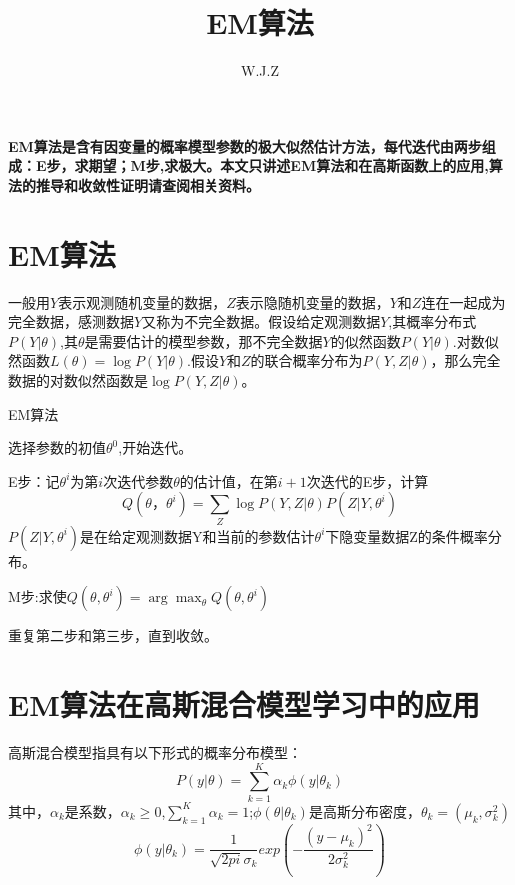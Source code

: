 \documentclass{article}
\title{EM算法}
\author{W.J.Z}
\date{}
\begin{document}
	\maketitle
	\textbf{EM算法是含有因变量的概率模型参数的极大似然估计方法，每代迭代由两步组成：E步，求期望；M步,求极大。本文只讲述EM算法和在高斯函数上的应用,算法的推导和收敛性证明请查阅相关资料。}
	\section{EM算法}
	一般用$Y$表示观测随机变量的数据，$Z$表示隐随机变量的数据，$Y$和$Z$连在一起成为完全数据，感测数据$Y$又称为不完全数据。假设给定观测数据$Y$,其概率分布式$P(Y|\theta )$,其$\theta $是需要估计的模型参数，那不完全数据$Y$的似然函数$P(Y|\theta )$.对数似然函数$L\left ( \theta  \right )=\log P\left ( Y|\theta  \right )$.假设$Y$和$Z$的联合概率分布为$P\left ( Y,Z|\theta  \right )$，那么完全数据的对数似然函数是$\log P\left ( Y,Z|\theta  \right )$。
	
	\begin{algorithm}[h]
		\caption{EM算法}
		\LinesNumbered
		
		选择参数的初值$\theta ^{0}$,开始迭代。
		
		E步：记$\theta ^{i}$为第$i$次迭代参数$\theta $的估计值，在第$i+1$次迭代的E步，计算$$Q\left ( \theta ，\theta ^{i} \right )=\sum _{Z}\log P\left ( Y,Z|\theta  \right )P\left ( Z|Y,\theta ^{i} \right )$$ 
		$P(Z|Y,\theta ^{i})$是在给定观测数据Y和当前的参数估计$\theta ^{i}$下隐变量数据Z的条件概率分布。
		
		M步:求使$Q\left ( \theta ,\theta ^{i} \right )=\arg \mathop{max }_{\theta }Q\left ( \theta ,\theta ^{i} \right )$
		
		重复第二步和第三步，直到收敛。
	\end{algorithm}

	\section{EM算法在高斯混合模型学习中的应用}
	\noindent 高斯混合模型指具有以下形式的概率分布模型：
	$$P\left ( y|\theta  \right )=\sum_{k=1}^{K}\alpha _{k}\phi \left ( y|\theta _{k} \right )$$
	其中，$\alpha _{k}$是系数，$\alpha _{k}\geq 0$,$\sum_{k=1}^{K}\alpha _{k}=1$;$\phi \left ( \theta |\theta _{k} \right )$是高斯分布密度，$\theta _{k}=\left ( \mu _{k} ,\sigma _{k} ^{2}\right )$
	$$\phi \left ( y|\theta _{k} \right )=\frac{1}{\sqrt{2pi}\sigma _{k}}exp\left ( -\frac{(y-\mu _{k})^{2}}{2\sigma _{k}^{2}} \right )$$
	
\end{document}
